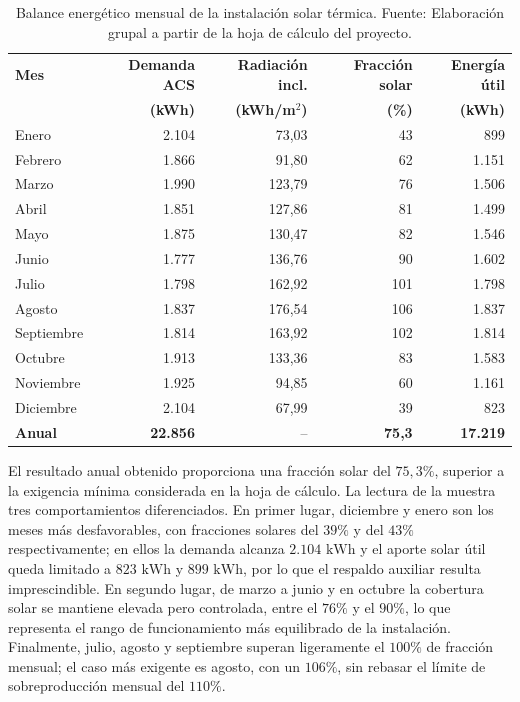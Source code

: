 \documentclass[12pt]{article}
\begin{document}
\begin{table}[H]
\centering
\caption{Balance energético mensual de la instalación solar térmica. Fuente: Elaboración grupal a partir de la hoja de cálculo del proyecto.}
\label{tab:balance_energetico_mensual}
\begin{tabular}{lrrrr}
\toprule
\textbf{Mes} & \textbf{Demanda ACS} & \textbf{Radiación incl.} & \textbf{Fracción solar} & \textbf{Energía útil} \\
 & \textbf{(kWh)} & \textbf{(kWh/m$^2$)} & \textbf{(\%)} & \textbf{(kWh)} \\
\midrule
Enero & 2.104 & 73,03 & 43 & 899 \\
Febrero & 1.866 & 91,80 & 62 & 1.151 \\
Marzo & 1.990 & 123,79 & 76 & 1.506 \\
Abril & 1.851 & 127,86 & 81 & 1.499 \\
Mayo & 1.875 & 130,47 & 82 & 1.546 \\
Junio & 1.777 & 136,76 & 90 & 1.602 \\
Julio & 1.798 & 162,92 & 101 & 1.798 \\
Agosto & 1.837 & 176,54 & 106 & 1.837 \\
Septiembre & 1.814 & 163,92 & 102 & 1.814 \\
Octubre & 1.913 & 133,36 & 83 & 1.583 \\
Noviembre & 1.925 & 94,85 & 60 & 1.161 \\
Diciembre & 2.104 & 67,99 & 39 & 823 \\
\midrule
\textbf{Anual} & \textbf{22.856} & -- & \textbf{75,3} & \textbf{17.219} \\
\bottomrule
\end{tabular}
\end{table}

El resultado anual obtenido proporciona una fracción solar del $75,3\%$, superior a la exigencia mínima considerada en la hoja de cálculo. La lectura de la  muestra tres comportamientos diferenciados. En primer lugar, diciembre y enero son los meses más desfavorables, con fracciones solares del $39\%$ y del $43\%$ respectivamente; en ellos la demanda alcanza $2.104\text{ kWh}$ y el aporte solar útil queda limitado a $823\text{ kWh}$ y $899\text{ kWh}$, por lo que el respaldo auxiliar resulta imprescindible. En segundo lugar, de marzo a junio y en octubre la cobertura solar se mantiene elevada pero controlada, entre el $76\%$ y el $90\%$, lo que representa el rango de funcionamiento más equilibrado de la instalación. Finalmente, julio, agosto y septiembre superan ligeramente el $100\%$ de fracción mensual; el caso más exigente es agosto, con un $106\%$, sin rebasar el límite de sobreproducción mensual del $110\%$.
\end{document}
